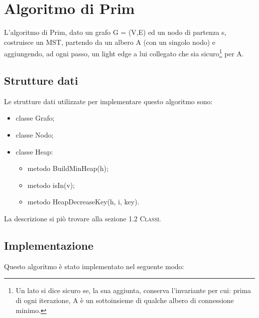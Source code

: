 \section{Algoritmo di Prim}
\label{Prim}

L'algoritmo di Prim, dato un grafo G = (V,E) ed un nodo di partenza s, costruisce un MST, partendo da un albero A (con un singolo nodo) e aggiungendo, ad ogni passo, un light edge a lui collegato che sia sicuro\footnote{Un lato si dice sicuro se, la sua aggiunta, conserva l'invariante per cui: prima di ogni iterazione, A è un sottoinsieme di qualche albero di connessione minimo.} per A.

\subsection{Strutture dati}
\label{strutture_dati}

Le strutture dati utilizzate per implementare questo algoritmo sono:

\begin{itemize}
    \item classe Grafo;
    \item classe Nodo;
    \item classe Heap:
    \begin{itemize}
        \item metodo BuildMinHeap(h);
        \item metodo isIn(v);
        \item metodo HeapDecreaseKey(h, i, key).
    \end{itemize}
\end{itemize}

La descrizione si piò trovare alla sezione \textsc{1.2 Classi}.

\subsection{Implementazione}
\label{implementazione}

Questo algoritmo è stato implementato nel seguente modo:

